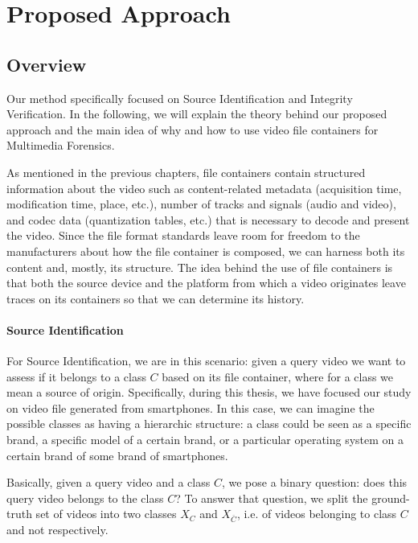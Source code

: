 \chapter{Proposed Approach}

\section{Overview}

Our method specifically focused on Source Identification and Integrity Verification. In the following, we will explain the theory behind our proposed approach and the main idea of why and how to use video file containers for Multimedia Forensics.

As mentioned in the previous chapters, file containers contain structured information about the video such as content-related metadata (acquisition time, modification time, place, etc.), number of tracks and signals (audio and video), and codec data (quantization tables, etc.) that is necessary to decode and present the video. Since the file format standards leave room for freedom to the manufacturers about how the file container is composed, we can harness both its content and, mostly, its structure. The idea behind the use of file containers is that both the source device and the platform from which a video originates leave traces on its containers so that we can determine its history.

\subsubsection*{Source Identification}

For Source Identification, we are in this scenario: given a query video we want to assess if it belongs to a class $C$ based on its file container, where for a class we mean a source of origin. Specifically, during this thesis, we have focused our study on video file generated from smartphones. In this case, we can imagine the possible classes as having a hierarchic structure: a class could be seen as a specific brand, a specific model of a certain brand, or a particular operating system on a certain brand of some brand of smartphones.

Basically, given a query video and a class $C$, we pose a binary question: does this query video belongs to the class $C$? To answer that question, we split the ground-truth set of videos into two classes $X_{C}$ and $X_{\overline{C}}$, i.e. of videos belonging to class $C$ and not respectively.

